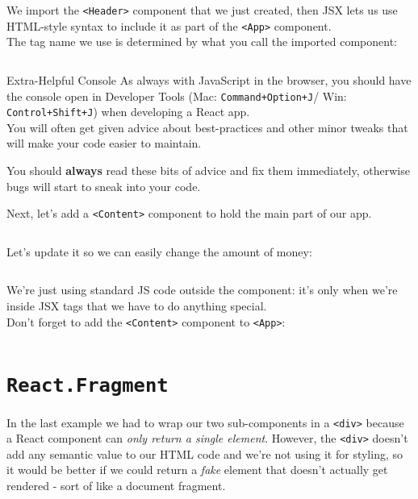 \inputminted{jsx}{02-jsx/figures/04-App-with-Header.jsx}

We import the \texttt{<Header>} component that we just created, then JSX lets us use HTML-style syntax to include it as part of the \texttt{<App>} component.
\\

The tag name we use is determined by what you call the imported component:

\inputminted{jsx}{02-jsx/figures/05-App-with-Fishsticks.jsx}


\begin{infobox}{Extra-Helpful Console}
    As always with JavaScript in the browser, you should have the console open in Developer Tools (Mac: \texttt{Command+Option+J}/ Win: \texttt{Control+Shift+J}) when developing a React app.
    \\

    You will often get given advice about best-practices and other minor tweaks that will make your code easier to maintain.


    You should \textbf{always} read these bits of advice and fix them immediately, otherwise bugs will start to sneak into your code.
\end{infobox}


Next, let's add a \texttt{<Content>} component to hold the main part of our app.

\inputminted{jsx}{02-jsx/figures/06-Content.jsx}

Let's update it so we can easily change the amount of money:

\inputminted{jsx}{02-jsx/figures/07-Content-with-JS.jsx}

We're just using standard JS code outside the component: it's only when we're inside JSX tags that we have to do anything special.
\\

Don't forget to add the \texttt{<Content>} component to \texttt{<App>}:

\inputminted{jsx}{02-jsx/figures/08-Content-in-App.jsx}


\section{\texttt{React.Fragment}}

In the last example we had to wrap our two sub-components in a \texttt{<div>} because a React component can \textit{only return a single element}. However, the \texttt{<div>} doesn't add any semantic value to our HTML code and we're not using it for styling, so it would be better if we could return a \textit{fake} element that doesn't actually get rendered - sort of like a document fragment.
\\

